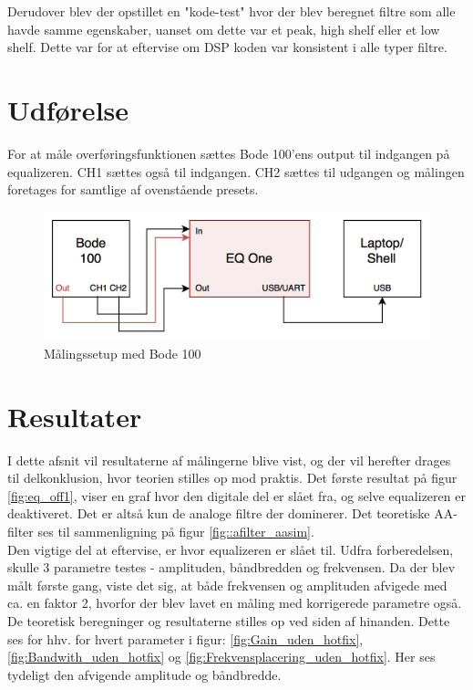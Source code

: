 Derudover blev der opstillet en "kode-test" hvor der blev beregnet filtre som alle havde samme egenskaber, uanset om dette var et peak, high shelf eller et low shelf. Dette var for at eftervise om DSP koden var konsistent i alle typer filtre. \\

\section{Udførelse}
For at måle overføringsfunktionen sættes Bode 100'ens output til indgangen på equalizeren. CH1 sættes også til indgangen. CH2 sættes til udgangen og målingen foretages for samtlige af ovenstående presets. \\


\begin{figure}[h!]\label{fig:bode_setup}
	\centering
	\includegraphics[width=13cm]{billeder/bode_setup}
	\caption{Målingssetup med Bode 100}
\end{figure}	

\FloatBlock

\section{Resultater}
I dette afsnit vil resultaterne af målingerne blive vist, og der vil herefter drages til delkonklusion, hvor teorien stilles op mod praktis.
Det første resultat på figur \ref{fig:eq_off1}, viser en graf hvor den digitale del er slået fra, og selve equalizeren er deaktiveret. Det er altså kun de analoge filtre der dominerer. Det teoretiske AA-filter ses til sammenligning på figur \ref{fig::afilter_aasim}. \\
Den vigtige del at eftervise, er hvor equalizeren er slået til. 
Udfra forberedelsen, skulle 3 parametre testes - amplituden, båndbredden og frekvensen. 
Da der blev målt første gang, viste det sig, at både frekvensen og amplituden afvigede med ca. en faktor 2, hvorfor der blev lavet en måling med korrigerede parametre også.
De teoretisk beregninger og resultaterne stilles op ved siden af hinanden.
Dette ses for hhv. for hvert parameter i figur: \ref{fig:Gain_uden_hotfix}, \ref{fig:Bandwith_uden_hotfix} og \ref{fig:Frekvensplacering_uden_hotfix}. 
Her ses tydeligt den afvigende amplitude og båndbredde.

